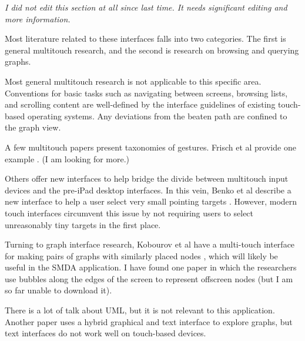 \emph{I did not edit this section at all since last time. It needs significant
editing and more information.}

Most literature related to these interfaces falls into two categories. The first
is general multitouch research, and the second is research on browsing and
querying graphs.

Most general multitouch research is not applicable to this specific area.
Conventions for basic tasks such as navigating between screens, browsing lists,
and scrolling content are well-defined by the interface guidelines of existing
touch-based operating systems. Any deviations from the beaten path are confined
to the graph view.

A few multitouch papers present taxonomies of gestures. Frisch et al provide one
example \cite{multitouch:gestures}. (I am looking for more.)

Others offer new interfaces to help bridge the divide between multitouch input
devices and the pre-iPad desktop interfaces. In this vein, Benko et al describe
a new interface to help a user select very small pointing targets
\cite{multitouch:tiny-select}. However, modern touch interfaces circumvent this
issue by not requiring users to select unreasonably tiny targets in the first
place.

Turning to graph interface research, Kobourov et al have a multi-touch interface
for making pairs of graphs with similarly placed nodes
\cite{graph-interaction:simultaneousgraphdrawing}, which will likely be
useful in the SMDA application. I have found one paper in which the
researchers use bubbles along the edges of the screen to represent offscreen
nodes (but I am so far unable to download it).

There is a lot of talk about UML, but it is not relevant to this application.
Another paper uses a hybrid graphical and text interface to explore graphs, but
text interfaces do not work well on touch-based devices.
